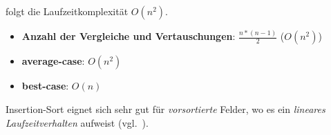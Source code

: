folgt die Laufzeitkomplexität $O(n^2)$.\\

\begin{itemize}
    \item \textbf{Anzahl der Vergleiche und Vertauschungen}: $\frac{n * ( n - 1)}{2}$ ($O(n^2)$)
    \item \textbf{average-case}: $O(n^2)$
    \item \textbf{best-case}: $O(n)$
\end{itemize}


\begin{tcolorbox}[title={Lineares Laufzeitverhalten}]
    Insertion-Sort eignet  sich sehr gut für \textit{vorsortierte} Felder, wo es ein \textit{lineares Laufzeitverhalten} aufweist (vgl.~\cite[188]{CL22}).
\end{tcolorbox}


